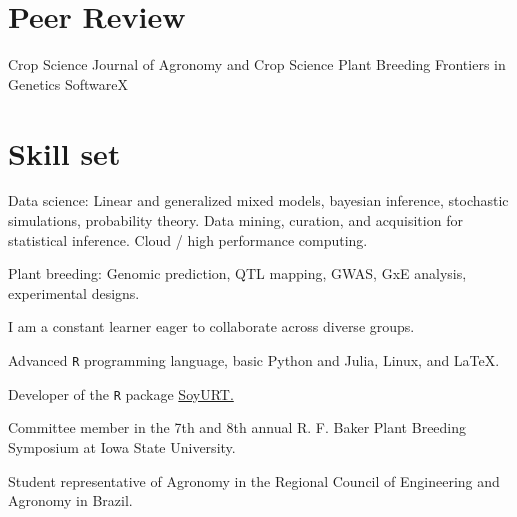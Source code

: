 \documentclass[]{mdkrause_cv_openfont}
\begin{document}
\begin{minipage}[t]{1\textwidth}
\section{Peer Review} 

\sectionsep

Crop Science \textbullet{} Journal of Agronomy and Crop Science \textbullet{} Plant Breeding \textbullet{} Frontiers in Genetics \textbullet{} SoftwareX

\sectionsep




\section{Skill set}

\sectionsep

\begin{tightemize}
	\vspace{0.5 mm}
	\item Data science: Linear and generalized mixed models, bayesian inference, stochastic simulations, probability theory. Data mining, curation, and acquisition for statistical inference. Cloud / high performance computing.
	\item Plant breeding: Genomic prediction, QTL mapping, GWAS, GxE analysis, experimental designs.
	\item I am a constant learner eager to collaborate across diverse groups.
\end{tightemize}

\sectionsep

\begin{tightemize}
	\item Advanced \texttt{R} programming language, basic Python and Julia, Linux, and \LaTeX.
	\item Developer of the \texttt{R} package \href{https://cran.r-project.org/web/packages/SoyURT/index.html}{SoyURT.} \ExternalLink
\end{tightemize}

\sectionsep

\begin{tightemize}
	\item {} Committee member in the 7th and 8th annual R. F. Baker Plant Breeding Symposium at Iowa State University.
	\item {} Student representative of Agronomy in the Regional Council of Engineering and Agronomy in Brazil.
\end{tightemize}


\end{minipage}
\end{document}
